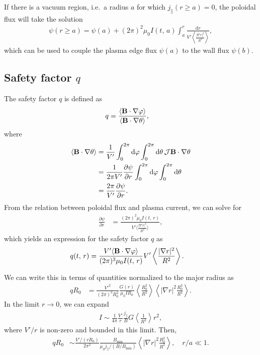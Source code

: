 \documentclass[11pt,a4paper]{article}
\newcommand{\rd}{\ensuremath{\mathrm{d}}}
\newcommand{\sub}[1]{\ensuremath{_{\text{#1}}}}
\renewcommand{\b}[1]{\ensuremath{ {\bf #1 } }}
\begin{document}
If there is a vacuum region, i.e.~a radius $a$ for which $j_\parallel(r\geq a) = 0$, the poloidal flux will take the solution 
\begin{align}
\psi(r\geq a) = \psi(a) + (2\pi)^2\mu_0 I(t,\,a) \int_a^r \frac{\rd r}{V'\left\langle \frac{|\nabla r|^2}{R^2}\right\rangle },
\end{align}
which can be used to couple the plasma edge flux $\psi(a)$ to the wall flux $\psi(b)$.

\subsection{Safety factor $q$}
The safety factor $q$ is defined as
\begin{align}
q &= \frac{\langle \b{B}\cdot\nabla\varphi\rangle}{\langle \b{B}\cdot\nabla\theta\rangle},
\end{align}
where
\begin{align}
\langle \b{B}\cdot\nabla\theta \rangle &= \frac{1}{V'} \int_0^{2\pi} \rd \varphi \int_0^{2\pi}\rd\theta \,\mathcal{J} \b{B}\cdot\nabla \theta \nonumber \\
&=\frac{1}{2\pi V'}\frac{\partial \psi}{\partial r} \int_0^{2\pi} \rd \varphi \int_0^{2\pi}\rd\theta  \nonumber \\
&= \frac{2\pi}{V'}\frac{\partial \psi}{\partial r}.
\end{align}
From the relation between poloidal flux and plasma current, we can solve for
\begin{align}
\frac{\partial \psi}{\partial r} &= \frac{(2\pi)^2 \mu_0 I(t,\,r)}{V'\langle\frac{|\nabla r|^2}{R^2}\rangle},
\end{align}
which yields an expression for the safety factor $q$ as
\begin{align}
q(t,\,r) &= \frac{V'\langle \b{B}\cdot\nabla\varphi\rangle}{(2\pi)^3 \mu_0 I(t,\,r)}V'\left\langle\frac{|\nabla r|^2}{R^2}\right\rangle.
\end{align}

We can write this in terms of quantities normalized to the major radius as
\begin{align}
q R_0 &=  \frac{V'^2}{(2\pi)^3R_0^2} \frac{G(r)}{\mu_0 I R_0} \left\langle \frac{R_0^2}{R^2}\right\rangle\left\langle|\nabla r|^2 \frac{R_0^2}{R^2}\right\rangle.
\end{align}
In the limit $r\to 0$, we can expand 
\begin{align}
I \sim \frac{1}{4\pi} \frac{V'}{r} \frac{j_\parallel}{B}G \left\langle\frac{1}{R^2}\right\rangle r^2,
\end{align}
where $V'/r$ is non-zero and bounded in this limit. Then,
\begin{align}
q R_0 &\sim  \frac{V'/(rR_0)}{2\pi^2 } \frac{B\sub{min}}{\mu_0 j_\parallel/(B/B\sub{min})}\left\langle|\nabla r|^2 \frac{R_0^2}{R^2}\right\rangle, \quad r/a \ll 1.
\end{align}
\end{document}
